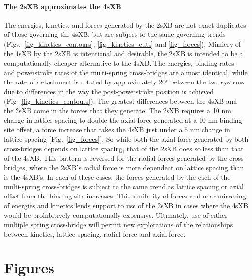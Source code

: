 \documentclass[]{article}
\begin{document}
\paragraph{The 2sXB approximates the 4sXB} %
The energies, kinetics, and forces generated by the 2sXB are not exact duplicates of those governing the 4sXB, but are subject to the same governing trends (Figs.~\ref{fig_kinetics_contours}, \ref{fig_kinetics_cuts} and \ref{fig_forces}). 
Mimicry of the 4sXB by the 2sXB is intentional and desirable, the 2sXB is intended to be a computationally cheaper alternative to the 4sXB\@. 
The energies, binding rates, and powerstroke rates of the multi-spring cross-bridges are almost identical, while the rate of detachment is rotated by approximately 20$^\circ$ between the two systems due to differences in the way the post-powerstroke position is achieved (Fig.~\ref{fig_kinetics_contours}).
The greatest differences between the 4sXB and the 2sXB come in the forces that they generate.
The 2sXB requires a 10 nm change in lattice spacing to double the axial force generated at a 10 nm binding site offset, a force increase that takes the 4sXB just under a 6 nm change in lattice spacing (Fig.~\ref{fig_forces}). 
So while both the axial force generated by both cross-bridges depends on lattice spacing, that of the 2sXB does so less than that of the 4sXB\@.
This pattern is reversed for the radial forces generated by the cross-bridges, where the 2sXB's radial force is more dependent on lattice spacing than is the 4sXB's.
In each of these cases, the forces generated by the each of the multi-spring cross-bridges is subject to the same trend as lattice spacing or axial offset from the binding site increases.
This similarity of forces and near mirroring of energies and kinetics lends support to use of the 2sXB in cases where the 4sXB would be prohibitively computationally expensive.
Ultimately, use of either multiple spring cross-bridge will permit new explorations of the relationships between kinetics, lattice spacing, radial force and axial force.



\clearpage
\section*{Figures} %
\end{document}
